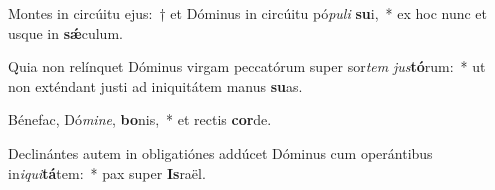 \item Montes in circúitu ejus:~† et Dóminus in circúitu pó\textit{pu}\textit{li} \textbf{su}i,~* ex hoc nunc et usque in \textbf{sǽ}culum.
\item Quia non relínquet Dóminus virgam peccatórum super sor\textit{tem} \textit{jus}\textbf{tó}rum:~* ut non exténdant justi ad iniquitátem manus \textbf{su}as.
\item Bénefac, Dó\textit{mi}\textit{ne}, \textbf{bo}nis,~* et rectis \textbf{cor}de.
\item Declinántes autem in obligatiónes addúcet Dóminus cum operántibus in\textit{i}\textit{qui}\textbf{tá}tem:~* pax super \textbf{Is}raël.
